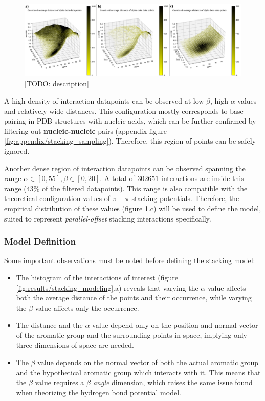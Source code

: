       \begin{figure}[H]
        \centering
        \includegraphics[width=1\textwidth]{figures/results/stacking_sampling.png}
        \caption{\label{fig:results/stacking_sampling} [TODO: description]}
      \end{figure}

      A high density of interaction datapoints can be observed at low $\beta$, high $\alpha$ values and relatively wide distances. This configuration mostly corresponds to base-pairing in PDB structures with nucleic acids, which can be further confirmed by filtering out \textbf{nucleic-nucleic} pairs (appendix figure \ref{fig:appendix/stacking_sampling}). Therefore, this region of points can be safely ignored.

      Another dense region of interaction datapoints can be observed spanning the range $\alpha \in [0,55], \beta \in [0,20]$. A total of $302651$ interactions are inside this range ($43 \%$ of the filtered datapoints). This range is also compatible with the theoretical configuration values of $\pi-\pi$ stacking potentials. Therefore, the empirical distribution of these values (figure \ref{fig:results/stacking_sampling}.c) will be used to define the model, suited to represent \textit{parallel-offset} stacking interactions specifically.

    \subsubsection{Model Definition}
      Some important observations must be noted before defining the stacking model:

      \begin{itemize}
        \item The histogram of the interactions of interest (figure \ref{fig:results/stacking_modeling}.a) reveals that varying the $\alpha$ value affects both the average distance of the points and their occurrence, while varying the $\beta$ value affects only the occurrence.
        \item The distance and the $\alpha$ value depend only on the position and normal vector of the aromatic group and the surrounding points in space, implying only three dimensions of space are needed.
        \item The $\beta$ value depends on the normal vector of both the actual aromatic group and the hypothetical aromatic group which interacts with it. This means that the $\beta$ value requires a \textit{$\beta$ angle} dimension, which raises the same issue found when theorizing the hydrogen bond potential model.
      \end{itemize}

